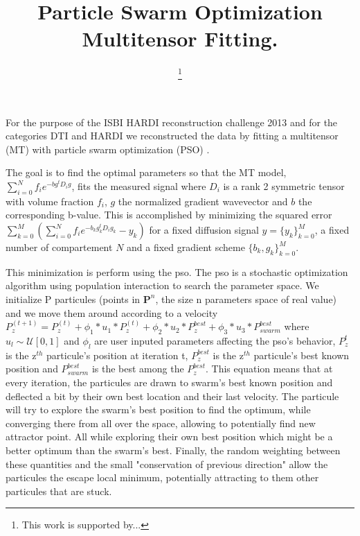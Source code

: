 \documentclass[9pt,conference,a4paper]{IEEEtran}
\title{Particle Swarm Optimization Multitensor Fitting.}
\author{
	\IEEEauthorblockN{
		Michael Paquette\IEEEauthorrefmark{1},
		Eleftherios Garyfallidis\IEEEauthorrefmark{1},
		Samuel St-Jean\IEEEauthorrefmark{1},
		Pierrick Coup\'e\IEEEauthorrefmark{2},
		Maxime Descoteaux\IEEEauthorrefmark{1}
	}

	\IEEEauthorblockA{\IEEEauthorrefmark{1} Universit\'e de Sherbrooke, Sherbrooke, Canada}
	\IEEEauthorblockA{\IEEEauthorrefmark{2} McGill University, Montreal, Canada}

	\thanks{This work is supported by...}
}
\begin{document}
\maketitle

For the purpose of the ISBI HARDI reconstruction challenge 2013 and for the categories DTI and HARDI we reconstructed the data by fitting a multitensor (MT) with particle swarm optimization (PSO) \cite{?pso?}. 

The goal is to find the optimal parameters so that the MT model, $\sum_{i=0}^N f_i e^{-b g^t D_i g}$, fits the measured signal where $D_i$ is a rank 2 symmetric tensor with volume fraction $f_i$, $g$ the normalized gradient wavevector and $b$ the corresponding b-value. This is accomplished by minimizing the squared error $\sum_{k=0}^M \left( \sum_{i=0}^N f_i e^{-b_k g_k^t D_i g_k} - y_k \right) $ for a fixed diffusion signal $y = \{y_k\}_{k=0}^M$, a fixed number of compartement $N$ and a fixed gradient scheme $ \{b_k, g_k\}_{k=0}^M$.

This minimization is perform using the pso. The pso is a stochastic optimization algorithm using population interaction to search the parameter space. We initialize P particules (points in $\mathbf{P}^n$, the size n parameters space of real value) and we move them around according to a velocity $P_z^{(t+1)} = P_z^{(t)} + \phi_1 * u_1 * P_z^{(t)} + \phi_2 * u_2 * P_z^{best} + \phi_3 * u_3 * P_{swarm}^{best}$ where $u_l \sim \mathcal{U}[0,1]$ and $\phi_l$ are user inputed parameters affecting the pso's behavior, $P_z^{t}$ is the z$^{th}$ particule's position at iteration t, $P_z^{best}$ is the z$^{th}$ particule's best known position and $P_{swarm}^{best}$ is the best among the $P_z^{best}$. This equation means that at every iteration, the particules are drawn to swarm's best known position and deflected a bit by their own best location and their last velocity. The particule will try to explore the swarm's best position to find the optimum, while converging there from all over the space, allowing to potentially find new attractor point. All while exploring their own best position which might be a better optimum than the swarm's best. Finally, the random weighting between these quantities and the small "conservation of previous direction" allow the particules the escape local minimum, potentially attracting to them other particules that are stuck.
\end{document}
